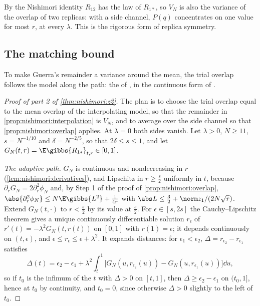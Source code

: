 \begin{refsection}
By the Nishimori identity $R_{12}$ has the law of $R_{1*}$, so $V_N$ is also the variance of the overlap of two replicas: with a side channel, $P(q)$ concentrates on one value for most $r$, at every $\lambda$. This is the rigorous form of replica symmetry.

\subsection{The matching bound}\label{sec:nishimori:matching}

To make Guerra's remainder a variance around the mean, the trial overlap follows the model along the path: the  of \textcite{BarbierMacris2019}, in the continuous form of \textcite{BarbierEtAl2019}.

\begin{proof}[Proof of part 2 of \cref{thm:nishimori:z2}]
The plan is to choose the trial overlap equal to the mean overlap of the interpolating model, so that the remainder in \cref{prop:nishimori:interpolation} is $V_N$, and to average over the side channel so that \cref{prop:nishimori:overlap} applies. At $\lambda=0$ both sides vanish. Let $\lambda>0$, $N\ge11$, $s=N^{-1/10}$ and $\delta=N^{-2/5}$, so that $2\delta\le s\le1$, and let $G_N(t,r)=\E\gibbs{R_{1*}}_{t,r}\in[0,1]$.

\emph{The adaptive path.} $G_N$ is continuous and nondecreasing in $r$ (\cref{lem:nishimori:derivatives}), and Lipschitz in $r\ge\frac s2$ uniformly in $t$, because $\partial_rG_N=2\partial_r^2\phi_N$ and, by Step 1 of the proof of \cref{prop:nishimori:overlap}, $\abs{\partial_r^2\phi_N}\le N\E\gibbs{L^2}+\frac1{4r}$ with $\abs L\le\frac32+\norm z_1/(2N\sqrt r)$. Extend $G_N(t,\cdot)$ to $r<\frac s2$ by its value at $\frac s2$. For $\epsilon\in[s,2s]$ the Cauchy--Lipschitz theorem gives a unique continuously differentiable solution $r_\epsilon$ of $r'(t)=-\lambda^2G_N(t,r(t))$ on $[0,1]$ with $r(1)=\epsilon$; it depends continuously on $(t,\epsilon)$, and $\epsilon\le r_\epsilon\le\epsilon+\lambda^2$. It expands distances: for $\epsilon_1<\epsilon_2$, $\Delta=r_{\epsilon_2}-r_{\epsilon_1}$ satisfies
\[
\Delta(t)=\epsilon_2-\epsilon_1+\lambda^2\int_t^1\bigl[G_N(u,r_{\epsilon_2}(u))-G_N(u,r_{\epsilon_1}(u))\bigr]\dd u,
\]
so if $t_0$ is the infimum of the $t$ with $\Delta>0$ on $[t,1]$, then $\Delta\ge\epsilon_2-\epsilon_1$ on $(t_0,1]$, hence at $t_0$ by continuity, and $t_0=0$, since otherwise $\Delta>0$ slightly to the left of $t_0$.


\end{proof}
\end{refsection}
